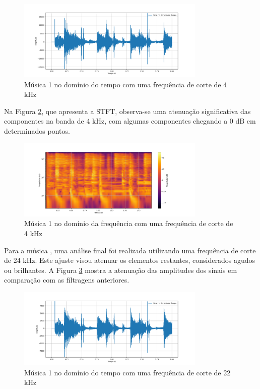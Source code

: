 \begin{figure}[h]
    \centering
    \includegraphics[width=0.8\textwidth]{figuras/fig26.png}
    \caption{Música 1 no domínio do tempo com uma frequência de corte de 4 kHz}
    \label{fig26}
\end{figure}

Na Figura \ref{fig27}, que apresenta a STFT, observa-se uma atenuação significativa das componentes na banda de 4 kHz, com algumas componentes chegando a 0 dB em determinados pontos.

\begin{figure}[h]
    \centering
    \includegraphics[width=0.8\textwidth]{figuras/fig27.png}
    \caption{Música 1 no domínio da frequência com uma frequência de corte de 4 kHz}
    \label{fig27}
\end{figure}

Para a música \cite{track01}, uma análise final foi realizada utilizando uma frequência de corte de 24 kHz. Este ajuste visou atenuar os elementos restantes, considerados agudos ou brilhantes. A Figura \ref{fig30} mostra a atenuação das amplitudes dos sinais em comparação com as filtragens anteriores.

\begin{figure}[h]
    \centering
    \includegraphics[width=0.8\textwidth]{figuras/fig30.png}
    \caption{Música 1 no domínio do tempo com uma frequência de corte de 22 kHz}
    \label{fig30}
\end{figure}

